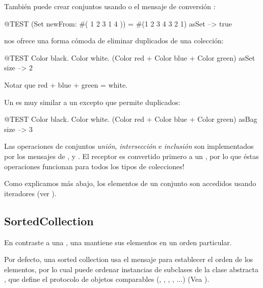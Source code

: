\documentclass[a4paper,10pt,twoside]{book}
\begin{document}
Tambi\'en puede crear conjuntos usando  o el mensaje de conversi\'on :

\begin{code}{@TEST}
(Set newFrom: #( 1 2 3 1 4 )) = #(1 2 3 4 3 2 1) asSet --> true
\end{code}

 nos ofrece una forma c\'omoda de eliminar duplicados de una colecci\'on:
\begin{code}{@TEST}
{ Color black. Color white. (Color red + Color blue + Color green) } asSet size --> 2
\end{code}
\noindent
Notar que red + blue + green = white.

Un  es muy similar a un  excepto que permite duplicados:
\begin{code}{@TEST}
{ Color black. Color white. (Color red + Color blue + Color green) } asBag size --> 3
\end{code}

Las operaciones de conjuntos \emph{uni\'on}, \emph{intersecci\'on} e \emph{inclusi\'on} son implementados por los mensajes de   ,  y .
El receptor es convertido primero a un , por lo que \'estas operaciones funcionan para todos los tipos de colecciones!


Como explicamos m\'as abajo, los elementos de un conjunto son accedidos usando iteradores (ver ).

\subsection{SortedCollection}
En contraste a una , una  mantiene sus elementos en un orden particular. 

Por defecto, una sorted collection usa el mensaje  para establecer el orden de los elementos, por lo cual puede ordenar instancias de subclases de la clase abstracta , que define el protocolo de objetos comparables (, , , , ...)
(Vea ).
\end{document}
